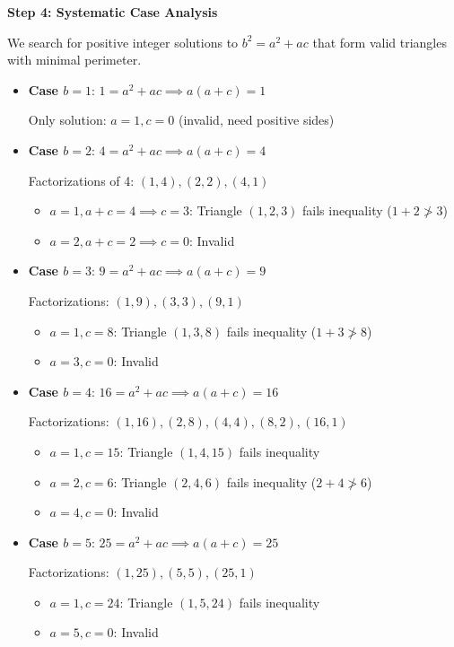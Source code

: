 \documentclass[12pt]{article}
\begin{document}
\begin{solutionbox}
\textbf{Step 4: Systematic Case Analysis}

We search for positive integer solutions to $b^2 = a^2 + ac$ that form valid triangles with minimal perimeter.

\begin{itemize}
    \item \textbf{Case $b = 1$}: $1 = a^2 + ac \implies a(a+c) = 1$ 
    
    Only solution: $a = 1, c = 0$ (invalid, need positive sides)
    
    \item \textbf{Case $b = 2$}: $4 = a^2 + ac \implies a(a+c) = 4$
    
    Factorizations of 4: $(1,4), (2,2), (4,1)$
    \begin{itemize}
        \item $a = 1, a+c = 4 \implies c = 3$: Triangle $(1,2,3)$ fails inequality ($1+2 \not> 3$)
        \item $a = 2, a+c = 2 \implies c = 0$: Invalid
    \end{itemize}
    
    \item \textbf{Case $b = 3$}: $9 = a^2 + ac \implies a(a+c) = 9$
    
    Factorizations: $(1,9), (3,3), (9,1)$
    \begin{itemize}
        \item $a = 1, c = 8$: Triangle $(1,3,8)$ fails inequality ($1+3 \not> 8$)
        \item $a = 3, c = 0$: Invalid
    \end{itemize}
    
    \item \textbf{Case $b = 4$}: $16 = a^2 + ac \implies a(a+c) = 16$
    
    Factorizations: $(1,16), (2,8), (4,4), (8,2), (16,1)$
    \begin{itemize}
        \item $a = 1, c = 15$: Triangle $(1,4,15)$ fails inequality
        \item $a = 2, c = 6$: Triangle $(2,4,6)$ fails inequality ($2+4 \not> 6$)
        \item $a = 4, c = 0$: Invalid
    \end{itemize}
    
    \item \textbf{Case $b = 5$}: $25 = a^2 + ac \implies a(a+c) = 25$
    
    Factorizations: $(1,25), (5,5), (25,1)$
    \begin{itemize}
        \item $a = 1, c = 24$: Triangle $(1,5,24)$ fails inequality
        \item $a = 5, c = 0$: Invalid
    \end{itemize}
    

\end{itemize}
\end{solutionbox}
\end{document}
